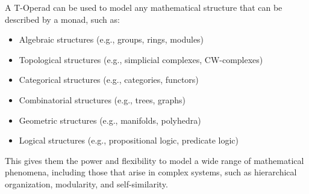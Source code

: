 A T-Operad can be used to model any mathematical structure that can be described by a monad, such as:
\begin{itemize}
    \item Algebraic structures (e.g., groups, rings, modules)
    \item Topological structures (e.g., simplicial complexes, CW-complexes)
    \item Categorical structures (e.g., categories, functors)
    \item Combinatorial structures (e.g., trees, graphs)
    \item Geometric structures (e.g., manifolds, polyhedra)
    \item Logical structures (e.g., propositional logic, predicate logic)
\end{itemize}

This gives them the power and flexibility to model a wide range of mathematical phenomena, including those that arise in complex systems, such as hierarchical organization, modularity, and self-similarity.

